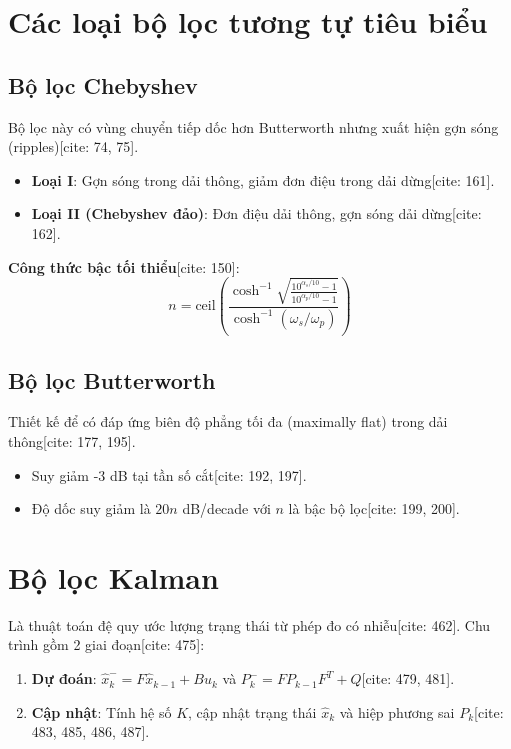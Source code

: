 \documentclass[12pt,a4paper]{article}
\begin{document}
\section{Các loại bộ lọc tương tự tiêu biểu}
\subsection{Bộ lọc Chebyshev}
Bộ lọc này có vùng chuyển tiếp dốc hơn Butterworth nhưng xuất hiện gợn sóng (ripples)[cite: 74, 75].
\begin{itemize}
    \item \textbf{Loại I}: Gợn sóng trong dải thông, giảm đơn điệu trong dải dừng[cite: 161].
    \item \textbf{Loại II (Chebyshev đảo)}: Đơn điệu dải thông, gợn sóng dải dừng[cite: 162].
\end{itemize}
\textbf{Công thức bậc tối thiểu}[cite: 150]:
\begin{equation}
    n = \text{ceil} \left( \frac{\cosh^{-1} \sqrt{\frac{10^{\alpha_s/10}-1}{10^{\alpha_p/10}-1}}}{\cosh^{-1}(\omega_s/\omega_p)} \right)
\end{equation}

\subsection{Bộ lọc Butterworth}
Thiết kế để có đáp ứng biên độ phẳng tối đa (maximally flat) trong dải thông[cite: 177, 195].
\begin{itemize}
    \item Suy giảm -3 dB tại tần số cắt[cite: 192, 197].
    \item Độ dốc suy giảm là $20n$ dB/decade với $n$ là bậc bộ lọc[cite: 199, 200].
\end{itemize}

\section{Bộ lọc Kalman}
Là thuật toán đệ quy ước lượng trạng thái từ phép đo có nhiễu[cite: 462]. Chu trình gồm 2 giai đoạn[cite: 475]:
\begin{enumerate}
    \item \textbf{Dự đoán}: $\hat{x}_k^- = F\hat{x}_{k-1} + Bu_k$ và $P_k^- = FP_{k-1}F^T + Q$[cite: 479, 481].
    \item \textbf{Cập nhật}: Tính hệ số $K$, cập nhật trạng thái $\hat{x}_k$ và hiệp phương sai $P_k$[cite: 483, 485, 486, 487].
\end{enumerate}
\end{document}

